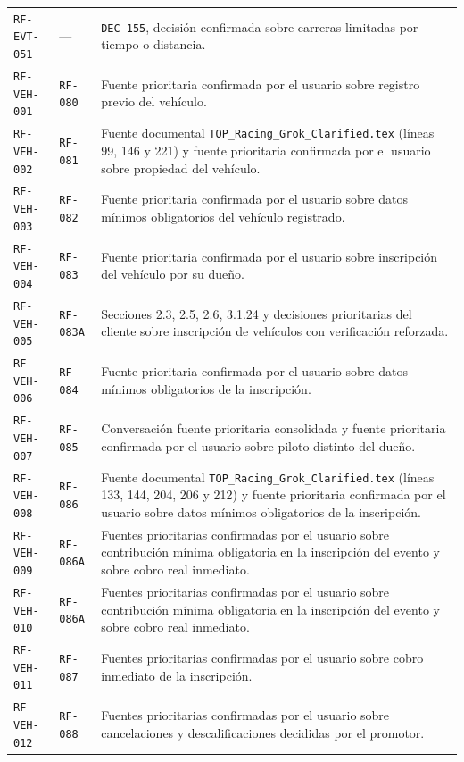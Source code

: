 \documentclass[10pt,letterpaper]{article}
\begin{document}
\begin{landscape}
\begin{longtable}{P{2.7cm}P{2.6cm}P{15.7cm}}
\texttt{RF-EVT-051} & --- & \texttt{DEC-155}, decisión confirmada sobre carreras limitadas por tiempo o distancia.\\
\texttt{RF-VEH-001} & \texttt{RF-080} & Fuente prioritaria confirmada por el usuario sobre registro previo del vehículo.\\
\texttt{RF-VEH-002} & \texttt{RF-081} & Fuente documental \texttt{TOP\_Racing\_Grok\_Clarified.tex} (líneas 99, 146 y 221) y fuente prioritaria confirmada por el usuario sobre propiedad del vehículo.\\
\texttt{RF-VEH-003} & \texttt{RF-082} & Fuente prioritaria confirmada por el usuario sobre datos mínimos obligatorios del vehículo registrado.\\
\texttt{RF-VEH-004} & \texttt{RF-083} & Fuente prioritaria confirmada por el usuario sobre inscripción del vehículo por su dueño.\\
\texttt{RF-VEH-005} & \texttt{RF-083A} & Secciones 2.3, 2.5, 2.6, 3.1.24 y decisiones prioritarias del cliente sobre inscripción de vehículos con verificación reforzada.\\
\texttt{RF-VEH-006} & \texttt{RF-084} & Fuente prioritaria confirmada por el usuario sobre datos mínimos obligatorios de la inscripción.\\
\texttt{RF-VEH-007} & \texttt{RF-085} & Conversación fuente prioritaria consolidada y fuente prioritaria confirmada por el usuario sobre piloto distinto del dueño.\\
\texttt{RF-VEH-008} & \texttt{RF-086} & Fuente documental \texttt{TOP\_Racing\_Grok\_Clarified.tex} (líneas 133, 144, 204, 206 y 212) y fuente prioritaria confirmada por el usuario sobre datos mínimos obligatorios de la inscripción.\\
\texttt{RF-VEH-009} & \texttt{RF-086A} & Fuentes prioritarias confirmadas por el usuario sobre contribución mínima obligatoria en la inscripción del evento y sobre cobro real inmediato.\\
\texttt{RF-VEH-010} & \texttt{RF-086A} & Fuentes prioritarias confirmadas por el usuario sobre contribución mínima obligatoria en la inscripción del evento y sobre cobro real inmediato.\\
\texttt{RF-VEH-011} & \texttt{RF-087} & Fuentes prioritarias confirmadas por el usuario sobre cobro inmediato de la inscripción.\\
\texttt{RF-VEH-012} & \texttt{RF-088} & Fuentes prioritarias confirmadas por el usuario sobre cancelaciones y descalificaciones decididas por el promotor.\\

\end{longtable}
\end{landscape}
\end{document}
